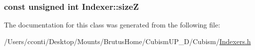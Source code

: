 \subsubsection[{size\+Z}]{\setlength{\rightskip}{0pt plus 5cm}const unsigned int Indexer\+::size\+Z\hspace{0.3cm}{\ttfamily [protected]}}\label{class_indexer_a054ea5515e47670dd528c1520c2fa698}


The documentation for this class was generated from the following file\+:\begin{DoxyCompactItemize}
\item 
/\+Users/cconti/\+Desktop/\+Mounts/\+Brutus\+Home/\+Cubism\+U\+P\+\_\+D/\+Cubism/\hyperlink{_indexers_8h}{Indexers.\+h}\end{DoxyCompactItemize}
